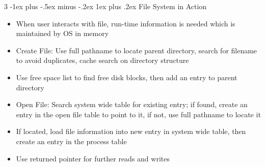 \documentclass[10pt, landscape]{article}
\makeatletter
\renewcommand{\subsection}{\@startsection{subsection}{3}{0mm}%
                                {-1ex plus -.5ex minus -.2ex}%
                                {1ex plus .2ex}%
                                {\normalfont\small\bfseries}}%
\makeatother
\begin{document}
\begin{multicols*}{3}
\subsection{File System in Action}
\begin{itemize}
    \item When user interacts with file, run-time information is needed which is maintained by OS in memory
    \item Create File: Use full pathname to locate parent directory, search for filename to avoid duplicates, cache search on directory structure
    \item Use free space list to find free disk blocks, then add an entry to parent directory
    \item Open File: Search system wide table for existing entry; if found, create an entry in the open file table to point to it, if not, use full pathname to locate it
    \item If located, load file information into new entry in system wide table, then create an entry in the process table
    \item Use returned pointer for further reads and writes
\end{itemize}

\end{multicols*}
\end{document}
